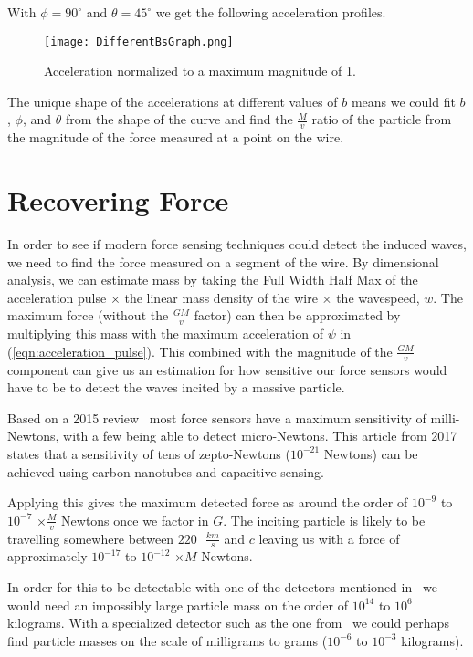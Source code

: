 \documentclass{report}
\begin{document}
With $\phi = 90^\circ$ and $\theta = 45^\circ$ we get the following acceleration profiles. 
\begin{figure}[H]
    \texttt{[image: DifferentBsGraph.png]}
    \caption{Acceleration normalized to a maximum magnitude of 1.}\label{fig:normAcc}
\end{figure}
The unique shape of the accelerations at different values of $b$ means we could fit $b$, $\phi$, and $\theta$ from the shape of the curve and find the $\frac{M}{v}$ ratio of the particle from the magnitude of the force measured at a point on the wire.

\section*{Recovering Force}
In order to see if modern force sensing techniques could detect the induced waves, we need to find the force measured on a segment of the wire.
By dimensional analysis, we can estimate mass by taking the Full Width Half Max of the acceleration pulse $\times$ the linear mass density of the wire $\times$ the wavespeed, $w$.
The maximum force (without the $\frac{G M}{v}$ factor) can then be approximated by multiplying this mass with the maximum acceleration of $\ddot\psi$ in (\ref{eqn:acceleration_pulse}). This combined with 
the magnitude of the $\frac{G M}{v}$ component can give us an estimation for how sensitive our force sensors would have to be to detect the waves incited by a massive particle.

Based on a 2015 review~\cite{WEI2015359} most force sensors have a maximum sensitivity of milli-Newtons, with a few being able to detect micro-Newtons.
This article from 2017~\cite{Moser2013} states that a sensitivity of tens of zepto-Newtons ($10^{-21}$ Newtons) can be achieved using carbon nanotubes and capacitive sensing. 

Applying this gives the maximum detected force as around the order of $10^{-9}$ to $10^{-7}$ $\times \frac{M}{v}$ Newtons once we factor in $G$. 
The inciting particle is likely to be travelling somewhere between $220 \text{ } \frac{km}{s}$ and $c$ leaving us with a force of approximately $10^{-17}$ to $10^{-12}$ $\times M$ Newtons.


In order for this to be detectable with one of the detectors mentioned in~\cite{WEI2015359} we would need an impossibly large particle mass on the order of $10^{14}$ to $10^{6}$ kilograms. 
With a specialized detector such as the one from~\cite{Moser2013} we could perhaps find particle masses on the scale of milligrams to grams ($10^{-6}$ to $10^{-3}$ kilograms). 
\end{document}
